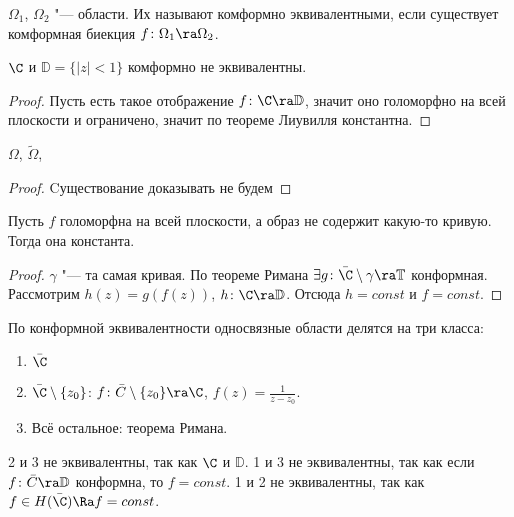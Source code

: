 \begin{Def}
	$\Omega_1$, $\Omega_2$ "--- области.
	Их называют комформно эквивалентными, если существует комформная биекция $f\colon \Omega_1 \ra \Omega_2$.
\end{Def}

\begin{theorem}
	$\C$ и $\mathbb D = \{|z| < 1 \}$ комформно не эквивалентны.
\end{theorem}

\begin{proof}
	Пусть есть такое отображение $f\colon \C \ra \mathbb D$, значит оно голоморфно на всей плоскости и ограничено, значит по теореме Лиувилля константна.
\end{proof}

\begin{theorem}
	$\Omega$, $\tilde \Omega$, \TODO
\end{theorem}

\begin{proof}
	Cуществование доказывать не будем 
\end{proof}

\TODO

\begin{conseq}
	Пусть $f$ голоморфна на всей плоскости, а образ не содержит какую-то кривую.
	Тогда она константа.
\end{conseq}
\begin{proof}
	$\gamma$ "--- та самая кривая. По теореме Римана $\exists g\colon \bar \C \setminus \gamma \ra \mathbb T$ конформная.
	Рассмотрим $h(z) = g(f(z))$, $h\colon \C \ra \mathbb D$. Отсюда $h = const$ и $f=const$.
\end{proof}

\begin{Rem}
	По конформной эквивалентности односвязные области делятся на три класса:
	\begin{enumerate}
		\item $\bar \C$
		\item $\bar \C \setminus \{z_0\}$: $f\colon \bar C \setminus \{z_0\} \ra \C$, $f(z) = \frac1{z-z_0}$.
		\item Всё остальное: теорема Римана.
	\end{enumerate}
	2 и 3 не эквивалентны, так как $\C$ и $\mathbb D$.
	1 и 3 не эквивалентны, так как если $f\colon \bar C \ra \mathbb D$ конформна, то $f = const$.
	1 и 2 не эквивалентны, так как $f \in H(\bar \C) \Ra f = const$.
\end{Rem}

